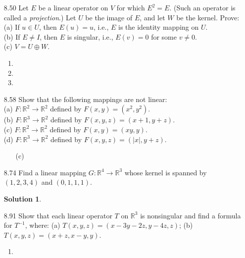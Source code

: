 \documentclass[12pt]{article}
\theoremstyle{plain}
\theoremstyle{definition}
\newtheorem*{solution}{Solution} %
\theoremstyle{plain}
\begin{document}
\begin{enumerate}
\item[8.50]Let $E$ be a linear operator on $V$ for which $E^2=E$. (Such an operator is called a \textit{projection}.) Let $U$ be the image of $E$, and let $W$ be the kernel. Prove:\\
(a) If $u\in U$, then $E(u)=u$, i.e., $E$ is the identity mapping on $U$.\\
(b) If $E\neq I$, then $E$ is singular, i.e., $E(v)=0$ for some $v\neq 0$.\\
(c) $V=U\oplus W$.
	\begin{enumerate}
	\item
	\item
	\item
	\end{enumerate}
\item[8.58]Show that the following mappings are not linear:\\
(a) $F:\mathbb{R}^2\rightarrow\mathbb{R}^2$ defined by $F(x,y)=(x^2,y^2)$.\\
(b) $F:\mathbb{R}^3\rightarrow\mathbb{R}^2$ defined by $F(x,y,z)=(x+1,y+z)$.\\
(c) $F:\mathbb{R}^2\rightarrow\mathbb{R}^2$ defined by $F(x,y)=(xy,y)$.\\
(d) $F:\mathbb{R}^3\rightarrow\mathbb{R}^2$ defined by $F(x,y,z)=(|x|,y+z)$.
	\begin{enumerate}
	\item[(c)]
	\end{enumerate}
	
\item[8.74]Find a linear mapping $G:\mathbb{R}^4\rightarrow\mathbb{R}^3$ whose kernel is spanned by $(1,2,3,4)$ and $(0,1,1,1)$.
	\begin{solution}
		
	\end{solution}
\item[8.91]Show that each linear operator $T$ on $\mathbb{R}^3$ is nonsingular and find a formula for $T^{-1}$, where: (a) $T(x,y,z)=(x-3y-2z,y-4z,z)$; (b) $T(x,y,z)=(x+z,x-y,y)$.
	\begin{enumerate}
	\item 
	\end{enumerate}
	

\end{enumerate}
\end{document}
